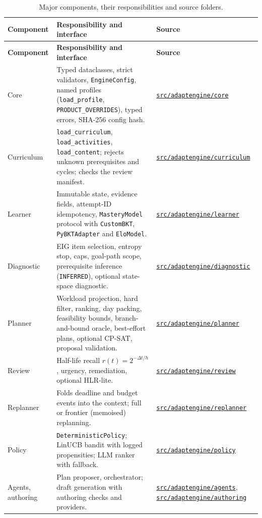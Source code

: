 \documentclass[11pt,a4paper]{article}
\newcommand{\finaltag}{cs5903-final-2026}
\newcommand{\repobase}{https://github.com/vhemanth06/AdaptEngine}
\newcommand{\repodir}[1]{\href{\repobase/tree/\finaltag/#1}{\nolinkurl{#1}}}
\begin{document}
\begin{xltabular}{\textwidth}{
    @{}
    >{\raggedright\arraybackslash}p{0.2\textwidth}
    >{\raggedright\arraybackslash}X
    >{\raggedright\arraybackslash}p{0.26\textwidth}
    @{}
}
\caption{Major components, their responsibilities and source folders.}
\label{tab:components}\\
\toprule
\textbf{Component} & \textbf{Responsibility and interface} & \textbf{Source} \\
\midrule
\endfirsthead
\toprule
\textbf{Component} & \textbf{Responsibility and interface} & \textbf{Source} \\
\midrule
\endhead
\bottomrule
\endfoot
Core & Typed dataclasses, strict validators, \texttt{EngineConfig}, named profiles (\texttt{load\_profile}, \texttt{PRODUCT\_OVERRIDES}), typed errors, SHA-256 config hash. & \repodir{src/adaptengine/core} \\
Curriculum & \texttt{load\_curriculum}, \texttt{load\_activities}, \texttt{load\_content}; rejects unknown prerequisites and cycles; checks the review manifest. & \repodir{src/adaptengine/curriculum} \\
Learner & Immutable state, evidence fields, attempt-ID idempotency, \texttt{MasteryModel} protocol with \texttt{CustomBKT}, \texttt{PyBKTAdapter} and \texttt{EloModel}. & \repodir{src/adaptengine/learner} \\
Diagnostic & EIG item selection, entropy stop, caps, goal-path scope, prerequisite inference (\texttt{INFERRED}), optional state-space diagnostic. & \repodir{src/adaptengine/diagnostic} \\
Planner & Workload projection, hard filter, ranking, day packing, feasibility bounds, branch-and-bound oracle, best-effort plans, optional CP-SAT, proposal validation. & \repodir{src/adaptengine/planner} \\
Review & Half-life recall $r(t)=2^{-\Delta t/h}$, urgency, remediation, optional HLR-lite. & \repodir{src/adaptengine/review} \\
Replanner & Folds deadline and budget events into the context; full or frontier (memoised) replanning. & \repodir{src/adaptengine/replanner} \\
Policy & \texttt{DeterministicPolicy}; LinUCB bandit with logged propensities; LLM ranker with fallback. & \repodir{src/adaptengine/policy} \\
Agents, authoring & Plan proposer, orchestrator; draft generation with authoring checks and providers. & \repodir{src/adaptengine/agents}, \repodir{src/adaptengine/authoring} \\

\end{xltabular}
\end{document}
